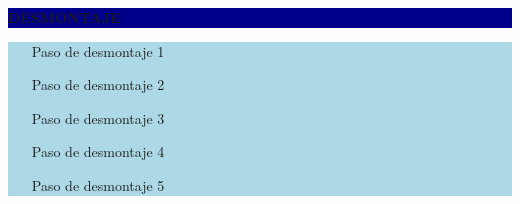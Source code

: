 \documentclass[11pt]{article}
\newcommand{\seccionbanda}[1]{%
  \vspace{0.6em}
  \noindent\colorbox{darkblue}{\parbox{\dimexpr\linewidth-2\fboxsep}{%
    \centering\color{white}\bfseries #1}}\par\vspace{0.6em}
}
\begin{document}
\seccionbanda{DESMONTAJE}
\noindent\colorbox{lightblue}{\parbox{\dimexpr\linewidth-2\fboxsep\relax}{%
\begin{itemize}[label=$\square$, itemsep=4pt]
\item [Paso de desmontaje 1]
\item [Paso de desmontaje 2]
\item [Paso de desmontaje 3]
\item [Paso de desmontaje 4]
\item [Paso de desmontaje 5]
\end{itemize}
}}\par
\end{document}
